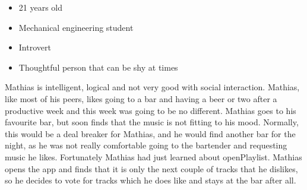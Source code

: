 \begin{itemize}
\item 21 years old
\item Mechanical engineering student
\item Introvert
\item Thoughtful person that can be shy at times
\end{itemize}

Mathias is intelligent, logical and not very good with social interaction. Mathias, like most of his peers, likes going to a bar and having a beer or two after a productive week and this week was going to be no different. Mathias goes to his favourite bar, but soon finds that the music is not fitting to his mood. Normally, this would be a deal breaker for Mathias, and he would find another bar for the night, as he was not really comfortable going to the bartender and requesting music he likes. Fortunately Mathias had just learned about openPlaylist. Mathias opens the app and finds that it is only the next couple of tracks that he dislikes, so he decides to vote for tracks which he does like and stays at the bar after all.
